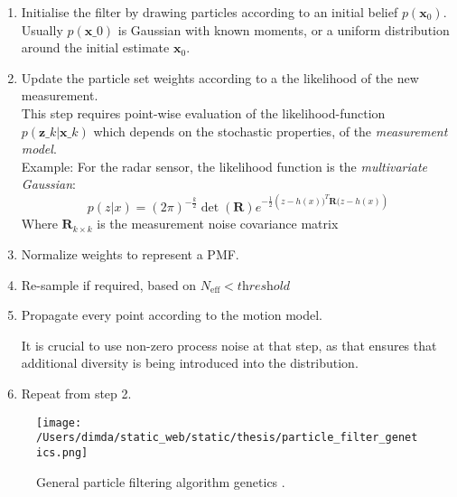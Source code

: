 \begin{enumerate}
	\item Initialise the filter by drawing particles according to an initial belief $p(\mathbf{x}_0)$.\\
	
	Usually  $p(\mathbf{x}\_0)$ is Gaussian with known moments, or a uniform distribution around the initial estimate  $\mathbf{x}_{0}$.
	
	\item Update the particle set weights according to a the likelihood of the new measurement.\\
	
	This step requires point-wise evaluation of the likelihood-function $p(\mathbf{z}\_k | \mathbf{x}\_k)$ which depends on the stochastic properties, of the \emph{measurement model}.\\
	
	Example: For the radar sensor, the likelihood function is the \emph{multivariate Gaussian}:
	$$
	p(z|x) = (2\pi)^{-\frac{k}{2}}\det{}(\mathbf{R})e^{-\frac{1}{2}\left(z-h(x))^{T}\mathbf{R}(z-h(x)\right)}
	$$
	Where $\mathbf{R}_{k\times k}$ is the measurement noise covariance matrix
	
	
	\item Normalize weights to represent a PMF.
	\item Re-sample if required, based on $N_{\text{eff}} < \textit{threshold}$
	\item Propagate every point according to the motion model.
	
	It is crucial to use non-zero process noise at that step, as that ensures that additional diversity is being introduced into the distribution.
	
	\item Repeat from step 2.
\end{enumerate}



\begin{figure}[H]
	\centering
	\texttt{[image: /Users/dimda/static\_web/static/thesis/particle\_filter\_genetics.png]}
	\caption{General particle filtering algorithm genetics \cite{Chatzi2002}.}
	\label{fig:PF_genetics}
\end{figure}

